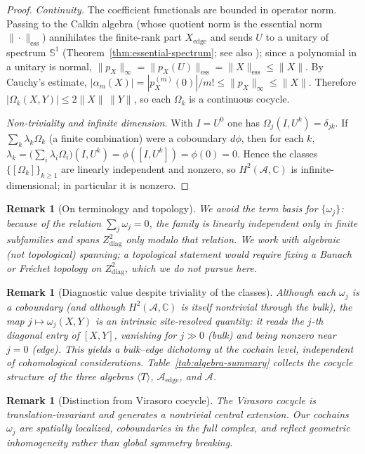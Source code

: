 \documentclass[10pt]{amsart}
\newcommand{\1}{{\mathbb{I}}}
\newtheorem{remark}[theorem]{Remark}
\numberwithin{equation}{section}
\begin{document}
\begin{proof}
\emph{Continuity.} The coefficient functionals are bounded in operator norm. Passing to the
Calkin algebra (whose quotient norm is the essential norm $\|\cdot\|_{\mathrm{ess}}$) annihilates the finite-rank part $X_{\mathrm{edge}}$ and sends $U$ to a unitary
of spectrum $\mathbb{S}^1$ (Theorem~\ref{thm:essential-spectrum}; see also
\cite{Conway90,Dou98}); since a polynomial in a
unitary is normal, $\|p_X\|_\infty=\|p_X(U)\|_{\mathrm{ess}}=\|X\|_{\mathrm{ess}}\le\|X\|$. By
Cauchy's estimate, $|\alpha_m(X)|=|p_X^{(m)}(0)|/m!\le\|p_X\|_\infty\le\|X\|$. Therefore
$|\Omega_k(X,Y)|\le 2\|X\|\,\|Y\|$, so each $\Omega_k$ is a continuous cocycle.

\emph{Non-triviality and infinite dimension.} With $I=U^0$ one has
$\Omega_j(I,U^k)=\delta_{jk}$. If $\sum_k\lambda_k\Omega_k$ (a finite combination) were a
coboundary $d\phi$, then for each $k$,
$\lambda_k=\bigl(\sum_i\lambda_i\Omega_i\bigr)(I,U^k)=\phi([I,U^k])=\phi(0)=0$. Hence the classes
$\{[\Omega_k]\}_{k\ge1}$ are linearly independent and nonzero, so
$H^2(\mathcal{A},\mathbb{C})$ is infinite-dimensional; in particular it is nonzero.
\end{proof}

\begin{remark}[On terminology and topology]
We avoid the term \emph{basis} for $\{\omega_j\}$: because of the relation
$\sum_j\omega_j=0$, the family is linearly independent only in finite subfamilies and spans
$Z^2_{\mathrm{diag}}$ only modulo that relation. We work with algebraic (not topological)
spanning; a topological statement would require fixing a Banach or Fr\'echet topology on
$Z^2_{\mathrm{diag}}$, which we do not pursue here.
\end{remark}

\begin{remark}[Diagnostic value despite triviality of the classes]
Although each $\omega_j$ is a coboundary (and although $H^2(\mathcal{A},\mathbb{C})$ is itself
nontrivial through the bulk), the map $j \mapsto \omega_j(X,Y)$ is an intrinsic site-resolved
quantity: it reads the $j$-th diagonal entry of $[X,Y]$, vanishing for $j \gg 0$ (bulk) and
being nonzero near $j = 0$ (edge). This yields a bulk--edge dichotomy at the cochain
level, independent of cohomological considerations. Table~\ref{tab:algebra-summary} collects
the cocycle structure of the three algebras $\langle T\rangle$, $\mathcal{A}_{\mathrm{edge}}$,
and $\mathcal{A}$.
\end{remark}

\begin{remark}[Distinction from Virasoro cocycle]
The Virasoro cocycle is translation-invariant and generates a nontrivial central extension.
Our cochains $\omega_j$ are spatially localized, coboundaries in the full complex, and reflect
geometric inhomogeneity rather than global symmetry breaking.
\end{remark}
\end{document}
